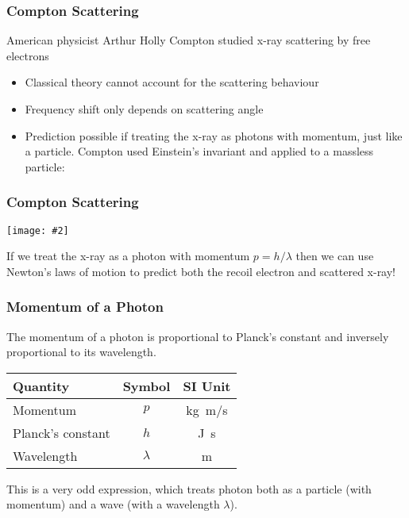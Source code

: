 \documentclass[12pt,compress,aspectratio=169]{beamer}
\newcommand{\pic}[2]{\texttt{[image: \#2]}}
\newcommand{\eq}[2]{\vspace{#1}{\Large\begin{displaymath}#2\end{displaymath}}}
\begin{document}
\begin{frame}
  \frametitle{Compton Scattering}
  American physicist Arthur Holly Compton studied x-ray scattering by free
  electrons
  \begin{itemize}
  \item Classical theory cannot account for the scattering behaviour
  \item Frequency shift only depends on scattering angle
  \item Prediction possible if treating the x-ray as photons with
    momentum, just like a particle. Compton used Einstein's invariant and
    applied to a massless particle:
  \end{itemize}

  \eq{-.3in}{
    \boxed{p=\frac{E}{c}=\frac{hf}{c}=\frac{h}{\lambda}}
  }
\end{frame}

\begin{frame}
  \frametitle{Compton Scattering}
  \begin{center}
    \pic{.5}{compton2}
  \end{center}
  If we treat the x-ray as a photon with momentum $p=h/\lambda$ then we can
  use Newton's laws of motion to predict both the recoil electron and scattered
  x-ray!
\end{frame}

\begin{frame}
  \frametitle{Momentum of a Photon}
  The momentum of a photon is proportional to Planck's constant and 
  inversely proportional to its wavelength.

  \eq{-.2in}{
    \boxed{p=\frac{h}{\lambda}}
  }
  \begin{center}
    \begin{tabular}{l|c|c}
      \rowcolor{pink}
      \textbf{Quantity} & \textbf{Symbol} & \textbf{SI Unit} \\ \hline
      Momentum          & $p$ & \si{\kilo\gram.\metre/\second}\\
      Planck's constant & $h$ & \si{\joule.\second}\\
      Wavelength        & $\lambda$ & \si{\metre}
    \end{tabular}
  \end{center}
  This is a very odd expression, which treats photon both as a particle (with
  momentum) and a wave (with a wavelength $\lambda$).
\end{frame}

\end{document}
